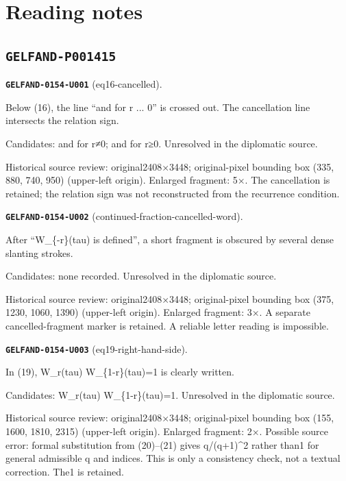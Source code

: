 \section*{Reading notes}
\subsection*{\texttt{GELFAND-P001415}}
\par\noindent\leavevmode{}\label{GELFAND-0154-U001}\textbf{\texttt{GELFAND-0154-U001}} (eq16-cancelled).\nopagebreak[4]\par
Below (16), the line “and for r ... 0” is crossed out. The cancellation line intersects the relation sign.\par
Candidates: and for r≠0; and for r≥0. Unresolved in the diplomatic source.\par
Historical source review: original2408×3448; original-pixel bounding box (335, 880, 740, 950) (upper-left origin). Enlarged fragment: 5×. The cancellation is retained; the relation sign was not reconstructed from the recurrence condition.\par\medskip
\par\noindent\leavevmode{}\label{GELFAND-0154-U002}\textbf{\texttt{GELFAND-0154-U002}} (continued-fraction-cancelled-word).\nopagebreak[4]\par
After “W\_\{-r\}(tau) is defined”, a short fragment is obscured by several dense slanting strokes.\par
Candidates: none recorded. Unresolved in the diplomatic source.\par
Historical source review: original2408×3448; original-pixel bounding box (375, 1230, 1060, 1390) (upper-left origin). Enlarged fragment: 3×. A separate cancelled-fragment marker is retained. A reliable letter reading is impossible.\par\medskip
\par\noindent\leavevmode{}\label{GELFAND-0154-U003}\textbf{\texttt{GELFAND-0154-U003}} (eq19-right-hand-side).\nopagebreak[4]\par
In (19), W\_r(tau) W\_\{1-r\}(tau)=1 is clearly written.\par
Candidates: W\_r(tau) W\_\{1-r\}(tau)=1. Unresolved in the diplomatic source.\par
Historical source review: original2408×3448; original-pixel bounding box (155, 1600, 1810, 2315) (upper-left origin). Enlarged fragment: 2×. Possible source error: formal substitution from (20)–(21) gives q/(q+1)\textasciicircum{}2 rather than1 for general admissible q and indices. This is only a consistency check, not a textual correction. The1 is retained.\par\medskip
